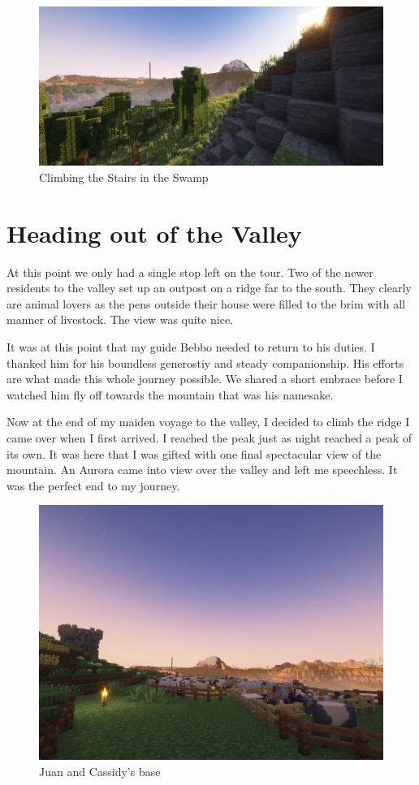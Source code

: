 \begin{figure}[H]
	\centering
	\includegraphics[width=\linewidth]{hills Near Bebbo.png}
	\caption{Climbing the Stairs in the Swamp}
\end{figure}
\newpage
\section{Heading out of the Valley}

At this point we only had a single stop left on the tour. Two of the newer residents to the valley set up an outpost on a ridge far to the south. They clearly are animal lovers as the pens outside their house were filled to the brim with all manner of livestock. The view was quite nice.

It was at this point that my guide Bebbo needed to return to his duties. I thanked him for his boundless generostiy and steady companionship. His efforts are what made this whole journey possible. We shared a short embrace before I watched him fly off towards the mountain that was his namesake.

Now at the end of my maiden voyage to the valley, I decided to climb the ridge I came over when I first arrived. I reached the peak just as night reached a peak of its own. It was here that I was gifted with one final spectacular view of the mountain. An Aurora came into view over the valley and left me speechless. It was the perfect end to my journey.

\begin{figure}[H]
	\centering
	\includegraphics[width=\linewidth]{Juans base.png}
	\caption{Juan and Cassidy's base}
\end{figure}

